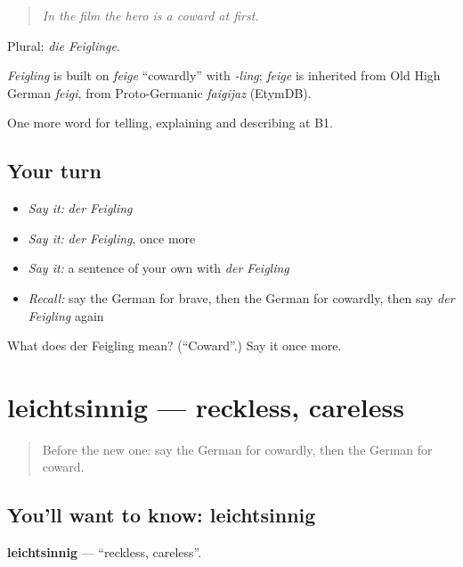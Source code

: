 \begin{quote}
\emph{In the film the hero is a coward at first.}
\end{quote}

Plural: \emph{die Feiglinge}.

\begin{cousinweb}
\emph{Feigling} is built on \emph{feige} \textquotedblleft{}cowardly\textquotedblright{} with \emph{-ling}; \emph{feige} is inherited from Old High German \emph{feigi}, from Proto-Germanic \emph{faigijaz} (EtymDB).
\end{cousinweb}

\begin{grammarlens}[title={What you've built}]
One more word for telling, explaining and describing at B1.
\end{grammarlens}

\subsection*{Your turn}
\begin{itemize}
\raggedright
  \item \emph{Say it:} \emph{der Feigling}
  \item \emph{Say it:} \emph{der Feigling}, once more
  \item \emph{Say it:} a sentence of your own with \emph{der Feigling}
  \item \emph{Recall:} say the German for brave, then the German for cowardly, then say \emph{der Feigling} again
\end{itemize}

\begin{tcolorbox}[breakable,colback=teal!4,colframe=teal!35!black,title={Before you move on}]
What does der Feigling mean? (\textquotedblleft{}Coward\textquotedblright{}.) Say it once more.
\end{tcolorbox}
\section[leichtsinnig]{leichtsinnig — reckless, careless}

\label{lesson:GE-C477-leichtsinnig}



\begin{quote}
Before the new one: say the German for cowardly, then the German for coward.
\end{quote}

\subsection*{You'll want to know: leichtsinnig}
\textbf{leichtsinnig} — \textquotedblleft{}reckless, careless\textquotedblright{}.


